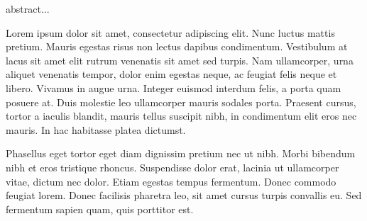 % 


abstract...

Lorem ipsum dolor sit amet, consectetur adipiscing elit. Nunc luctus mattis pretium. Mauris egestas risus non lectus dapibus condimentum. Vestibulum at lacus sit amet elit rutrum venenatis sit amet sed turpis. Nam ullamcorper, urna aliquet venenatis tempor, dolor enim egestas neque, ac feugiat felis neque et libero. Vivamus in augue urna. Integer euismod interdum felis, a porta quam posuere at. Duis molestie leo ullamcorper mauris sodales porta. Praesent cursus, tortor a iaculis blandit, mauris tellus suscipit nibh, in condimentum elit eros nec mauris. In hac habitasse platea dictumst.

Phasellus eget tortor eget diam dignissim pretium nec ut nibh. Morbi bibendum nibh et eros tristique rhoncus. Suspendisse dolor erat, lacinia ut ullamcorper vitae, dictum nec dolor. Etiam egestas tempus fermentum. Donec commodo feugiat lorem. Donec facilisis pharetra leo, sit amet cursus turpis convallis eu. Sed fermentum sapien quam, quis porttitor est.